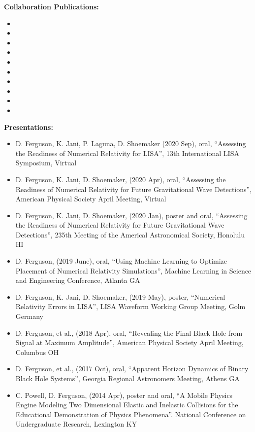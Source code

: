 \documentclass[11pt]{article}
\begin{document}
\begin{flushleft}
  \textbf{Collaboration Publications:}
  \begin{itemize}
  \item {}
  \item {}
  \item {}
  \item {}
  \item {}
  \item {}
  \item {}
  \item {}
  \item {}
  \item {}
  \end{itemize}

  \textbf{Presentations:}
  \begin{itemize}
  \item D. Ferguson, K. Jani, P. Laguna, D. Shoemaker (2020 Sep), oral, ``Assessing the Readiness of Numerical Relativity for LISA'', 13th International LISA Symposium, Virtual
  \item D. Ferguson, K. Jani, D. Shoemaker, (2020 Apr), oral, ``Assessing the Readiness of Numerical Relativity for Future Gravitational Wave Detections'', American Physical Society April Meeting, Virtual
  \item D. Ferguson, K. Jani, D. Shoemaker, (2020 Jan), poster and oral, ``Assessing the Readiness of Numerical Relativity for Future Gravitational Wave Detections'', 235th Meeting of the Americal Astronomical Society, Honolulu HI
  \item D. Ferguson, (2019 June), oral, ``Using Machine Learning to Optimize Placement of Numerical Relativity Simulations'', Machine Learning in Science and Engineering Conference, Atlanta GA
  \item D. Ferguson, K. Jani, D. Shoemaker, (2019 May), poster, ``Numerical Relativity Errors in LISA'', LISA Waveform Working Group Meeting, Golm Germany
  \item D. Ferguson, et al., (2018 Apr), oral, ``Revealing the Final Black Hole from Signal at Maximum Amplitude'', American Physical Society April Meeting, Columbus OH
  \item D. Ferguson, et al., (2017 Oct), oral, ``Apparent Horizon Dynamics of Binary Black Hole Systems'', Georgia Regional Astronomers Meeting, Athens GA
  \item C. Powell, D. Ferguson, (2014 Apr), poster and oral, ``A Mobile Physics Engine Modeling Two Dimensional Elastic and Inelastic Collisions for the Educational Demonstration of Physics Phenomena''. National Conference on Undergraduate Research, Lexington KY  
  \end{itemize}
  

\end{flushleft}
\end{document}
